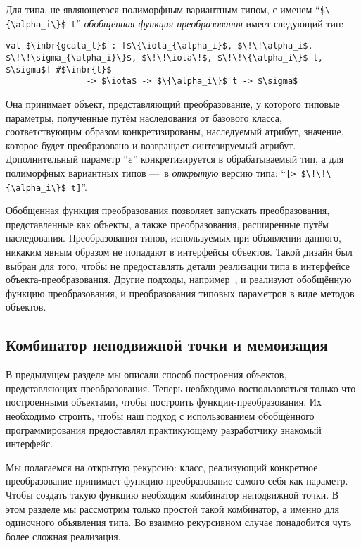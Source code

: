 Для типа, не являющегося полиморфным вариантным типом, с именем ``\lstinline|$\{\alpha_i\}$ t|'' \emph{обобщенная функция преобразования} имеет следующий тип:

\begin{lstlisting}
val $\inbr{gcata_t}$ : [$\{\iota_{\alpha_i}$, $\!\!\alpha_i$, $\!\!\sigma_{\alpha_i}\}$, $\!\!\iota\!$, $\!\!\{\alpha_i\}$ t, $\sigma$] #$\inbr{t}$ 
                -> $\iota$ -> $\{\alpha_i\}$ t -> $\sigma$
\end{lstlisting}

Она принимает объект, представляющий преобразование, у которого типовые параметры, полученные путём наследования от базового класса, соответствующим образом конкретизированы, наследуемый атрибут, значение, которое будет преобразовано и возвращает синтезируемый атрибут.
Дополнительный параметр ``$\varepsilon$'' конкретизируется в обрабатываемый тип, а 
для полиморфных вариантных типов ---~в \emph{открытую}
версию типа:  ``\lstinline|[> $\!\!\{\alpha_i\}$ t]|''. 

Обобщенная функция преобразования позволяет запускать   преобразования, представленные как объекты, а также преобразования, расширенные путём наследования. Преобразования типов, используемых при объявлении данного, никаким явным образом не попадают в интерфейсы объектов. Такой дизайн был выбран для того, чтобы не предоставлять детали реализации типа в интерфейсе объекта-преобразования. Другие подходы, например~\cite{Visitors}, и реализуют обобщённую функцию преобразования, и преобразования типовых параметров в виде методов объектов.


\subsection{Комбинатор неподвижной точки и мемоизация}
\label{memofix}

В предыдущем разделе мы описали способ построения объектов, представляющих преобразования. Теперь необходимо воспользоваться только что построенными объектами, чтобы построить функции-преобразования. Их необходимо строить, чтобы наш подход с использованием обобщённого программирования предоставлял практикующему разработчику знакомый интерфейс.

Мы полагаемся  на открытую рекурсию: класс, реализующий конкретное преобразование принимает функцию-преобразование самого себя как параметр.
Чтобы создать такую функцию необходим комбинатор неподвижной точки. В  этом разделе
мы рассмотрим только простой такой комбинатор, а именно для одиночного объявления типа.
Во взаимно рекурсивном случае понадобится чуть более сложная реализация. %

